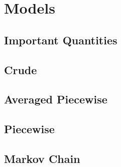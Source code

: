 \chapter{Models}
\section{Important Quantities}
\section{Crude}
\section{Averaged Piecewise}
\section{Piecewise}
\section{Markov Chain}